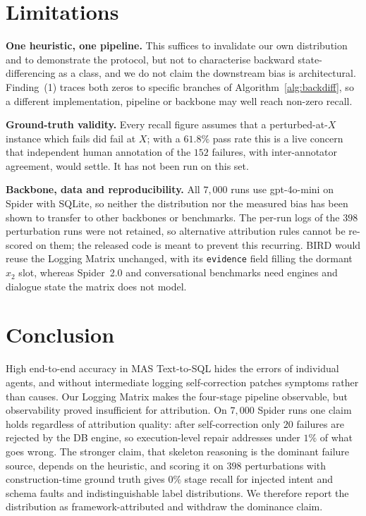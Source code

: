\documentclass{llncs}
\begin{document}
\section{Limitations}
\label{sec:limitations}

\noindent\textbf{One heuristic, one pipeline.} This suffices to invalidate our
own distribution and to demonstrate the protocol, but not to characterise
backward state-differencing as a class, and we do not claim the downstream
bias is architectural. Finding~(1) traces both zeros to specific branches of
Algorithm~\ref{alg:backdiff}, so a different implementation, pipeline or
backbone may well reach non-zero recall.

\noindent\textbf{Ground-truth validity.} Every recall figure assumes that a
perturbed-at-$X$ instance which fails did fail at $X$; with a $61.8\%$ pass
rate this is a live concern that independent human annotation of the $152$
failures, with inter-annotator agreement, would settle. It has not been run
on this set.

\noindent\textbf{Backbone, data and reproducibility.} All $7{,}000$ runs use
gpt-4o-mini on Spider with SQLite, so neither the distribution nor the
measured bias has been shown to transfer to other backbones or benchmarks.
The per-run logs of the $398$ perturbation runs were not retained, so
alternative attribution rules cannot be re-scored on them; the released code
is meant to prevent this recurring. BIRD would reuse the Logging Matrix
unchanged, with its \texttt{evidence} field filling the dormant $x_2$ slot,
whereas Spider~2.0 and conversational benchmarks need engines and dialogue
state the matrix does not model.

\section{Conclusion}
\label{sec:conclusion}

High end-to-end accuracy in MAS Text-to-SQL hides the errors of individual
agents, and without intermediate logging self-correction patches symptoms
rather than causes. Our Logging Matrix makes the four-stage pipeline
observable, but observability proved insufficient for attribution. On
$7{,}000$ Spider runs one claim holds regardless of attribution quality: after
self-correction only $20$ failures are rejected by the DB engine, so
execution-level repair addresses under $1\%$ of what goes wrong. The stronger
claim, that skeleton reasoning is the dominant failure source, depends on the
heuristic, and scoring it on $398$ perturbations with construction-time ground
truth gives $0\%$ stage recall for injected intent and schema faults and
indistinguishable label distributions. We therefore report the distribution
as framework-attributed and withdraw the dominance claim.
\end{document}
